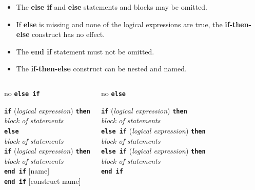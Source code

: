 \documentclass[slidestop,mathserif,compress,xcolor=svgnames]{beamer}
\newcommand{\bftt}[1]{\textbf{\texttt{#1}}}
\begin{document}
\begin{frame}[allowframebreaks]
  \framebreak
  \begin{itemize}
    \item The \textbf{else if} and \textbf{else} statements and blocks may be omitted.
    \item If \textbf{else} is missing and none of the logical expressions are true, the \textbf{if-then-else} construct has no effect.
    \item The \textbf{end if} statement must not be omitted.
    \item The \textbf{if-then-else} construct can be nested and named.
  \end{itemize}
  \begin{columns}
    \column{6cm}
    \begin{block}{\scriptsize no \bftt{else if}}
      \begin{tabbing}
        [co\=nstruct name:] \textbf{\texttt{if}} (\textit{logical expression}) \textbf{\texttt{then}} \\
        \> \textit{block of statements} \\
        \textbf{\texttt{else}} \\
        \> \textit{block of statements} \\
        \>[na\=me:] \textbf{\texttt{if}} (\textit{logical expression}) \textbf{\texttt{then}} \\
        \>\>\textit{block of statements} \\
        \>\textbf{\texttt{end if}} [name] \\
        \textbf{\texttt{end if}} [construct name]
      \end{tabbing}
    \end{block}
    \column{5cm}
    \begin{block}{\scriptsize no \bftt{else}}
      \begin{tabbing}
        \textbf{\texttt{if}} \=(\textit{logical expression}) \textbf{\texttt{then}} \\
        \> \textit{block of statements} \\
        \textbf{\texttt{else if}} (\textit{logical expression}) \textbf{\texttt{then}} \\
        \> \textit{block of statements} \\
        \textbf{\texttt{else if}} (\textit{logical expression}) \textbf{\texttt{then}} \\
        \> \textit{block of statements} \\
        \textbf{\texttt{end if}}
      \end{tabbing}
    \end{block}
  \end{columns}
\end{frame}
\end{document}
